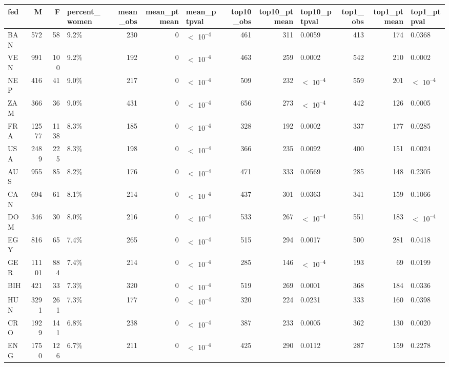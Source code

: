 
\begin{tabular}[t]{lrrlrrlrrlrrl}
\toprule
fed & M & F & percent_women & mean_obs & mean_ptmean & mean_ptpval & top10_obs & top10_ptmean & top10_ptpval & top1_obs & top1_ptmean & top1_ptpval\\
\midrule
BAN & 572 & 58 & 9.2\% & 230 & 0 & $<$ 10\textsuperscript{--4} & 461 & 311 & 0.0059 & 413 & 174 & 0.0368\\
VEN & 991 & 100 & 9.2\% & 192 & 0 & $<$ 10\textsuperscript{--4} & 463 & 259 & 0.0002 & 542 & 210 & 0.0002\\
NEP & 416 & 41 & 9.0\% & 217 & 0 & $<$ 10\textsuperscript{--4} & 509 & 232 & $<$ 10\textsuperscript{--4} & 559 & 201 & $<$ 10\textsuperscript{--4}\\
ZAM & 366 & 36 & 9.0\% & 431 & 0 & $<$ 10\textsuperscript{--4} & 656 & 273 & $<$ 10\textsuperscript{--4} & 442 & 126 & 0.0005\\
FRA & 12577 & 1138 & 8.3\% & 185 & 0 & $<$ 10\textsuperscript{--4} & 328 & 192 & 0.0002 & 337 & 177 & 0.0285\\
USA & 2489 & 225 & 8.3\% & 198 & 0 & $<$ 10\textsuperscript{--4} & 366 & 235 & 0.0092 & 400 & 151 & 0.0024\\
AUS & 955 & 85 & 8.2\% & 176 & 0 & $<$ 10\textsuperscript{--4} & 471 & 333 & 0.0569 & 285 & 148 & 0.2305\\
CAN & 694 & 61 & 8.1\% & 214 & 0 & $<$ 10\textsuperscript{--4} & 437 & 301 & 0.0363 & 341 & 159 & 0.1066\\
DOM & 346 & 30 & 8.0\% & 216 & 0 & $<$ 10\textsuperscript{--4} & 533 & 267 & $<$ 10\textsuperscript{--4} & 551 & 183 & $<$ 10\textsuperscript{--4}\\
EGY & 816 & 65 & 7.4\% & 265 & 0 & $<$ 10\textsuperscript{--4} & 515 & 294 & 0.0017 & 500 & 281 & 0.0418\\
GER & 11101 & 884 & 7.4\% & 214 & 0 & $<$ 10\textsuperscript{--4} & 285 & 146 & $<$ 10\textsuperscript{--4} & 193 & 69 & 0.0199\\
BIH & 421 & 33 & 7.3\% & 320 & 0 & $<$ 10\textsuperscript{--4} & 519 & 269 & 0.0001 & 368 & 184 & 0.0336\\
HUN & 3291 & 261 & 7.3\% & 177 & 0 & $<$ 10\textsuperscript{--4} & 320 & 224 & 0.0231 & 333 & 160 & 0.0398\\
CRO & 1929 & 141 & 6.8\% & 238 & 0 & $<$ 10\textsuperscript{--4} & 387 & 233 & 0.0005 & 362 & 130 & 0.0020\\
ENG & 1750 & 126 & 6.7\% & 211 & 0 & $<$ 10\textsuperscript{--4} & 425 & 290 & 0.0112 & 287 & 159 & 0.2278\\

\end{tabular}

